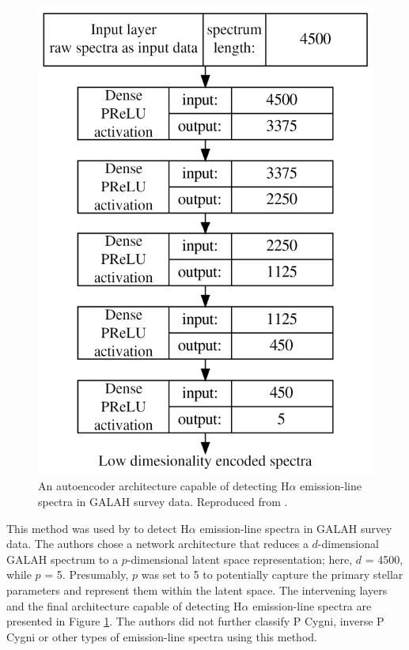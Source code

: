 \begin{figure}[!htb]
\centering
\includegraphics[scale=0.45]{figures/autoencoder.png}
\caption{An autoencoder architecture capable of detecting H$\alpha$ emission-line spectra in GALAH survey data. Reproduced from \citet{vcotar2021galah}.}
\label{fig2.7}
\end{figure}

This method was used by \citet{vcotar2021galah} to detect H$\alpha$ emission-line spectra in GALAH survey data. The authors chose a network architecture that reduces a $d$-dimensional GALAH spectrum to a $p$-dimensional latent space representation; here, $d$ = 4500, while $p$ = 5. Presumably, $p$ was set to 5 to potentially capture the primary stellar parameters and represent them within the latent space. The intervening layers and the final architecture capable of detecting H$\alpha$ emission-line spectra are presented in Figure \ref{fig2.7}. The authors did not further classify P Cygni, inverse P Cygni or other types of emission-line spectra using this method. 

